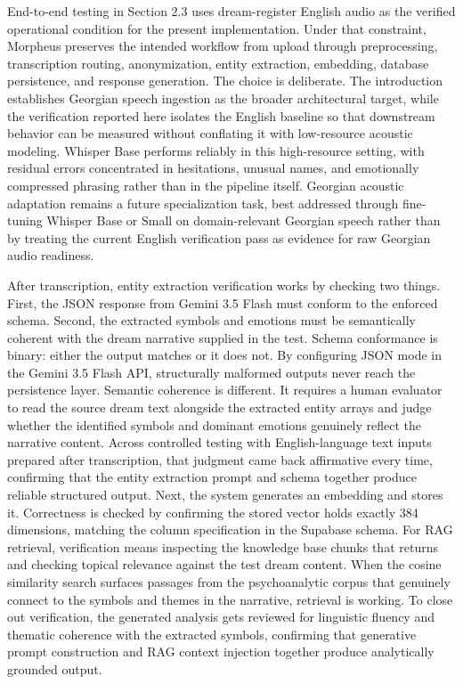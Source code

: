 \documentclass[12pt,a4paper]{report}
\DeclareRobustCommand{\code}[1]{\texttt{\detokenize{#1}}}
\begin{document}
End-to-end testing in Section 2.3 uses dream-register English audio as the verified operational condition for the present implementation. Under that constraint, Morpheus preserves the intended workflow from upload through preprocessing, transcription routing, anonymization, entity extraction, embedding, database persistence, and response generation. The choice is deliberate. The introduction establishes Georgian speech ingestion as the broader architectural target, while the verification reported here isolates the English baseline so that downstream behavior can be measured without conflating it with low-resource acoustic modeling. Whisper Base performs reliably in this high-resource setting, with residual errors concentrated in hesitations, unusual names, and emotionally compressed phrasing rather than in the pipeline itself. Georgian acoustic adaptation remains a future specialization task, best addressed through fine-tuning Whisper Base or Small on domain-relevant Georgian speech rather than by treating the current English verification pass as evidence for raw Georgian audio readiness.

After transcription, entity extraction verification works by checking two things. First, the JSON response from Gemini 3.5 Flash must conform to the enforced schema. Second, the extracted symbols and emotions must be semantically coherent with the dream narrative supplied in the test. Schema conformance is binary: either the output matches or it does not. By configuring JSON mode in the Gemini 3.5 Flash API, structurally malformed outputs never reach the persistence layer. Semantic coherence is different. It requires a human evaluator to read the source dream text alongside the extracted entity arrays and judge whether the identified symbols and dominant emotions genuinely reflect the narrative content. Across controlled testing with English-language text inputs prepared after transcription, that judgment came back affirmative every time, confirming that the entity extraction prompt and schema together produce reliable structured output. Next, the system generates an embedding and stores it. Correctness is checked by confirming the stored vector holds exactly 384 dimensions, matching the \code{vector(384)} column specification in the Supabase \code{pgvector} schema. For RAG retrieval, verification means inspecting the knowledge base chunks that \code{match_documents} returns and checking topical relevance against the test dream content. When the cosine similarity search surfaces passages from the psychoanalytic corpus that genuinely connect to the symbols and themes in the narrative, retrieval is working. To close out verification, the generated analysis gets reviewed for linguistic fluency and thematic coherence with the extracted symbols, confirming that generative prompt construction and RAG context injection together produce analytically grounded output.
\end{document}
